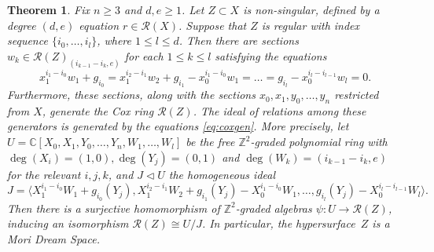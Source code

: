 \documentclass[a4paper,11pt]{amsart}
\theoremstyle{plain}
\newtheorem{theorem}{Theorem}[section]
\theoremstyle{definition}
\newcommand{\C}{\mathbb{C}}
\newcommand{\R}{\mathcal{R}}
\newcommand{\Z}{\mathbb{Z}}
\begin{document}
\begin{theorem}\label{thm:general} Fix $n \geq 3$ and $d,e \geq 1$. Let $Z \subset X$ is non-singular, defined by a degree $(d,e)$ equation $r \in \R(X)$. Suppose that $Z$ is regular with index sequence $\{i_0,\dots,i_l\}$, where $1 \leq l \leq d$. Then there are sections $w_k \in \R(Z)_{(i_{k-1} - i_k,e)}$ for each $1 \leq k \leq l$ satisfying the equations
    \begin{equation}\label{eq:coxgen}
    x_1^{i_1 - i_0} w_1 + g_{i_0} = x_1^{i_2 - i_1} w_2 + g_{i_1} - x_0^{i_1 - i_0} w_1 = \dots = g_{i_l} - x_0^{i_l - i_{l-1}} w_l = 0.
   \end{equation}
    Furthermore, these sections, along with the sections $x_0,x_1,y_0, \dots,y_n$ restricted from $X$, generate the Cox ring $\R(Z)$. The ideal of relations among these generators is generated by the equations \eqref{eq:coxgen}. More precisely, let $U = \C[X_0, X_1, Y_0, \dots, Y_n, W_1,\dots,W_l]$ be the free $\Z^2$-graded polynomial ring with $\deg(X_i) = (1,0), \deg(Y_j) = (0,1)$ and $\deg(W_k) = (i_{k-1} - i_k,e)$ for the relevant $i,j,k$, and $J\lhd U$ the homogeneous ideal
    \begin{equation*}
       J = \langle X_1^{i_1 - i_0} W_1 + g_{i_0}(Y_j), X_1^{i_2 - i_1} W_2 + g_{i_1}(Y_j) - X_0^{i_1 - i_0} W_1,  \dots , g_{i_l}(Y_j) - X_0^{i_l - i_{l-1}} W_l\rangle. 
    \end{equation*}
    Then there is a surjective homomorphism of $\Z^2$-graded algebras
    $\psi : U \rightarrow \R(Z)$, inducing an isomorphism $\R(Z) \cong U/J$. In particular, the hypersurface~$Z$ is a Mori Dream Space.
\end{theorem}
\end{document}
